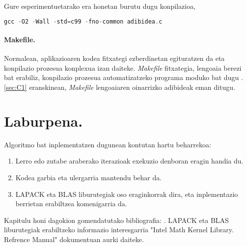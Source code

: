 Gure esperimentuetarako era honetan burutu dugu konpilazioa,
\begin{lstlisting}[language=C]
gcc -O2 -Wall -std=c99 -fno-common adibidea.c
\end{lstlisting}

\paragraph*{Makefile.}

Normalean, aplikazioaren kodea fitxategi ezberdinetan egituratzen da eta konpilazio prozesua konplexua izan daiteke. \emph{Makefile} fitxategia, lengoaia berezi bat erabiliz, konpilazio prozesua automatizatzeko programa moduko bat dugu \cite{EijkhoutHPC}. \ref{sec:C1} eranskinean, \emph{Makefile} lengoaiaren oinarrizko adibideak eman ditugu.

\section{Laburpena.}

Algoritmo bat inplementatzen dugunean kontutan hartu beharrekoa:

\begin{enumerate}

\item Lerro edo zutabe araberako iterazioak exekuzio denboran eragin handia du.

\item Kodea garbia eta ulergarria mantendu behar da.

\item LAPACK eta BLAS liburutegiak oso eraginkorrak dira, eta inplementazio berrietan erabiltzea komenigarria da.


\end{enumerate}

Kapitulu honi dagokion gomendatutako bibliografia: \cite{Pacheco2011,EijkhoutHPC,Goedecker2001,Hogben2013}.
LAPACK eta BLAS liburutegiak erabiltzeko informazio interesgarria "Intel Math Kernel Library. Refrence Manual" \cite{Intel2015} dokumentuan aurki daiteke.
